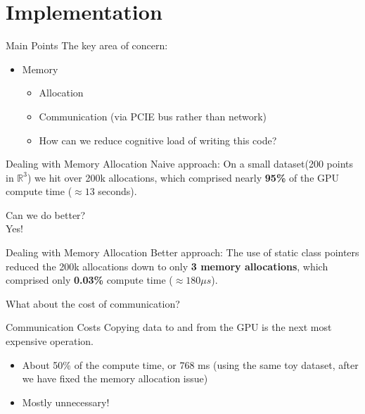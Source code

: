 \documentclass{beamer}
\begin{document}
\section{Implementation}
\begin{frame}{Main Points}
  The key area of concern:
  \begin{itemize}
    \item Memory
      \begin{itemize}
        \item Allocation \pause
        \item Communication (via PCIE bus rather than network) \pause
        \item How can we reduce cognitive load of writing this code?
      \end{itemize}
  \end{itemize}
\end{frame}

\begin{frame}{Dealing with Memory Allocation}
  Naive approach:
  On a small dataset(200 points in $\mathbb{R}^3$) we hit over 200k allocations,
  which comprised nearly \textbf{95\%} of the GPU compute time ($\approx 13$
    seconds).
\end{frame}

\begin{frame}[standout]
  Can we do better?\\ \pause
  Yes!
\end{frame}


\begin{frame}{Dealing with Memory Allocation}
  Better approach:
  The use of static class pointers reduced the 200k allocations down to only
  \textbf{3 memory allocations}, which comprised only \textbf{0.03\%} compute
    time ($\approx 180 \mu s$).
\end{frame}

\begin{frame}[standout]
  What about the cost of communication?
\end{frame}

\begin{frame}{Communication Costs}
  Copying data to and from the GPU is the next most expensive operation.
  \begin{itemize}
    \item About 50\% of the compute time, or 768 ms (using the same toy dataset,
      after we have fixed the memory allocation issue) \pause
    \item Mostly unnecessary!
  \end{itemize}
\end{frame}
\end{document}
